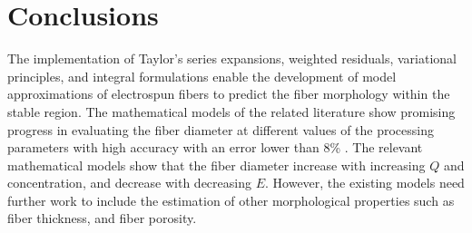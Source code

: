 \chapter{Conclusions} %

\label{Chapter:Conclusions}

The implementation of Taylor's series expansions, weighted residuals, variational principles, and integral formulations enable the development of model approximations of electrospun fibers to predict the fiber morphology within the stable region. The mathematical models of the related literature \cite{Feng2002, Gupta2004, Helgeson2008, Hohman2001, Reneker2006, Roozemond2007, Taylor1969, Yarin2011} show promising progress in evaluating the fiber diameter at different values of the processing parameters with high accuracy with an error lower than 8\% \cite{Nagham2017}. The relevant mathematical models show that the fiber diameter increase with increasing $Q$ and concentration, and decrease with decreasing $E$. However, the existing models need further work to include the estimation of other morphological properties such as fiber thickness, and fiber porosity.